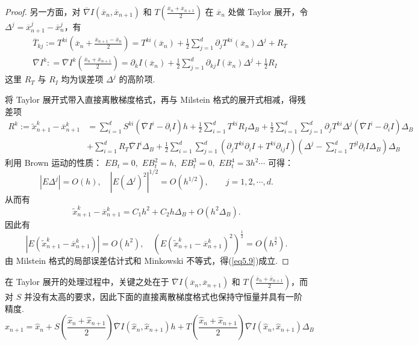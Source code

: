 \begin{proof}
	另一方面，对 $\overline \nabla I(\overline x_n,\overline x_{n+1})$ 和 $T(\frac{\overline x_n+\overline x_{n+1}}{2})$ 在 $\overline x_n$ 处做 Taylor 展开，令 $\Delta^j = \overline x_{n+1}^j - \overline x_{n}^j$，有
	\[ 
	\begin{aligned}
	&\overline T_{kj} := T^{ki} \left(\overline x_n + \frac{\overline x_{n+1}-\overline x_{n}}{2}\right) =  T^{ki}(\overline x_n) + \frac12\sum_{j=1}^d \partial _j T^{ki}(\overline x_n) \Delta^j + R_T\\
	&\overline \nabla I^k: = \overline \nabla I^k\left(\frac{\overline x_n+\overline x_{n+1}}{2}\right) =
	\partial_{k} I(\overline x_n)+\frac{1}{2} \sum_{j=1}^{d} \partial_{k j} I(\overline x_n) \Delta^{j}+\frac{1}{2} R_{I}
	\end{aligned}
	\]
	这里 $R_T$ 与 $R_I$ 均为误差项 $\Delta ^ j$ 的高阶项.  
	
	
	将 Taylor 展开式带入直接离散梯度格式，再与 Milstein 格式的展开式相减，得残差项
	\[
	\begin{aligned}
	R^k := \tilde{x}^k_{n+1} -\overline x_{n+1}^k  &=\sum_{i=1}^{d} S^{k i}\left(\overline {\nabla} I^{i}-\partial_{i} I\right) h+\frac{1}{2} \sum_{i=1}^{d} T^{k i} R_{I} \Delta_B+\frac{1}{2} \sum_{i=1}^{d} \sum_{j=1}^{d} \partial_{j} T^{k i} \Delta^{j}\left(\overline{\nabla} I^{i}-\partial_{i} I\right) \Delta_B \\
	&+\sum_{i=1}^{d} R_{T} \overline{\nabla} I^{i} \Delta _B+\frac{1}{2} \sum_{i=1}^{d} \sum_{j=1}^{d}\left(\partial_{j} T^{k i} \partial_{i} I+T^{k i} \partial_{i j} I\right)\left(\Delta^{j}-\sum_{l=1}^{d} T^{j l} \partial_{l} I \Delta _B\right) \Delta _B
	\end{aligned}
	\]
	利用 Brown 运动的性质： $E B_t = 0,\text{~} EB_t^2 = h,\text{~} EB_t^3=0,\text{~} EB_t^4 = 3h^2\cdots$ 可得：
	\[
	|E\Delta^j| = O(h),\quad |E(\Delta^j)^2|^{1/2} = O(h^{1/2}),\qquad j=1,2,\cdots,d.
	\]
	从而有
	\[
	\tilde{x}^k_{n+1} -\overline x_{n+1}^k = C_1 h^2 + C_2h\Delta_B + O(h^2\Delta_B).
	\]
	因此有
	\[
		\left| E(\tilde{x}^k_{n+1} -\overline x_{n+1}^k) \right| = O(h^2),\quad
		\left( E(\tilde{x}^k_{n+1} -\overline x_{n+1}^k)^2 \right)^{\frac12} = O(h^{\frac32}).
	\]
	由 Milstein 格式的局部误差估计式和 Minkowski 不等式，得(\ref{eq5.9})成立. 
\end{proof}

在 Taylor 展开的处理过程中，关键之处在于 $\overline{\nabla}I(\overline{ x }_n , \overline{ x }_{n+1})$ 和 $T(\frac{\overline{ x }_n + \overline{ x }_{n+1}}2)$，而对 $S$ 并没有太高的要求，因此下面的直接离散梯度格式也保持守恒量并具有一阶精度. 
\begin{equation}\label{scheme_discrete_2}
\hat{ x }_{n+1} = \hat x_n + S\left(\frac{\hat x_n+\hat x_{n+1}}{2}\right) \overline \nabla I(\hat{ x }_n,\hat{ x }_{n+1}) h + T\left( \frac{\hat{ x }_n + \hat{ x }_{n+1}}{2} \right)\overline \nabla I(\hat{ x }_n,\hat{ x }_{n+1}) \Delta_B
\end{equation}

